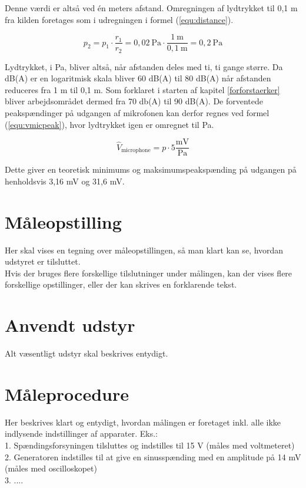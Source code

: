 Denne værdi er altså ved én meters afstand. Omregningen af lydtrykket til 0,1 m fra kilden foretages som i udregningen i formel (\ref{equ:distance}).

\begin{equation}
\label{equ:distance}
p_2 = p_1 \cdot \frac{r_1}{r_2} = 0,02~\mathrm{Pa} \cdot \frac{1~\mathrm{m}}{0,1~\mathrm{m}} = 0,2~\mathrm{Pa}
\end{equation}

Lydtrykket, i Pa, bliver altså, når afstanden deles med ti, ti gange større. Da dB(A) er en logaritmisk skala bliver 60 dB(A) til 80 dB(A) når afstanden reduceres fra 1 m til 0,1 m. Som forklaret i starten af kapitel \ref{forforstaerker} bliver arbejdsområdet dermed fra 70 db(A) til 90 dB(A). De forventede peakspændinger på udgangen af mikrofonen kan derfor regnes ved formel (\ref{equ:vmicpeak}), hvor lydtrykket igen er omregnet til Pa.

\begin{equation}
\label{equ:vmicpeak}
\hat{V}_{\mathrm{microphone}} = p \cdot 5\frac{\mathrm{mV}}{\mathrm{Pa}}
\end{equation}

Dette giver en teoretisk minimums og maksimumspeakspænding på udgangen på henholdsvis 3,16 mV og 31,6 mV.

\section{Måleopstilling}
\label{mic_output_maaleopstilling}
Her skal vises en tegning over måleopstillingen, så man klart kan se, hvordan udstyret er tilsluttet.\\
Hvis der bruges flere forskellige tilslutninger under målingen, kan der vises flere forskellige opstillinger, eller der kan skrives en forklarende tekst.\\

\section{Anvendt udstyr}
\label{mic_output_anvendtudstyr}
Alt væsentligt udstyr skal beskrives entydigt.\\

\section{Måleprocedure}
\label{mic_output_maaleprocedure}
Her beskrives klart og entydigt, hvordan målingen er foretaget inkl. alle ikke indlysende indstillinger af apparater. Eks.: \\
1. Spændingsforsyningen tilsluttes og indstilles til 15 V (måles med voltmeteret) \\
2. Generatoren indstilles til at give en sinusspænding med en amplitude på 14 mV (måles med oscilloskopet) \\
3. ....\\

